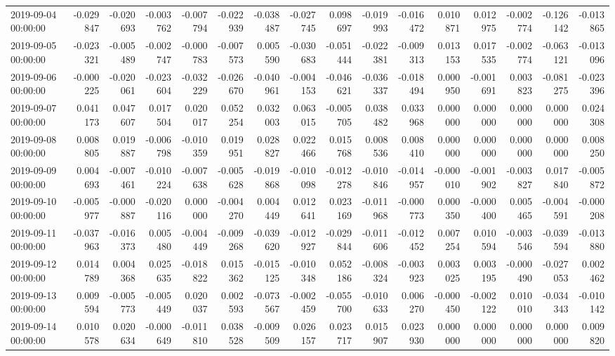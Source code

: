 \begin{tabular}{lrrrrrrrrrrrrrrr}
2019-09-04 00:00:00 & -0.029847 & -0.020693 & -0.003762 & -0.007794 & -0.022939 & -0.038487 & -0.027745 & 0.098697 & -0.019993 & -0.016472 & 0.010871 & 0.012975 & -0.002774 & -0.126142 & -0.013865 \\
2019-09-05 00:00:00 & -0.023321 & -0.005489 & -0.002747 & -0.000783 & -0.007573 & 0.005590 & -0.030683 & -0.051444 & -0.022381 & -0.009313 & 0.013153 & 0.017535 & -0.002774 & -0.063121 & -0.013096 \\
2019-09-06 00:00:00 & -0.000225 & -0.020061 & -0.023604 & -0.032229 & -0.026670 & -0.040961 & -0.004153 & -0.046621 & -0.036337 & -0.018494 & 0.000950 & -0.001691 & 0.003823 & -0.081275 & -0.023396 \\
2019-09-07 00:00:00 & 0.041173 & 0.047607 & 0.017504 & 0.020017 & 0.052254 & 0.032003 & 0.063015 & -0.005705 & 0.038482 & 0.033968 & 0.000000 & 0.000000 & 0.000000 & 0.000000 & 0.024308 \\
2019-09-08 00:00:00 & 0.008805 & 0.019887 & -0.006798 & -0.010359 & 0.019951 & 0.028827 & 0.022466 & 0.015768 & 0.008536 & 0.008410 & 0.000000 & 0.000000 & 0.000000 & 0.000000 & 0.008250 \\
2019-09-09 00:00:00 & 0.004693 & -0.007461 & -0.010224 & -0.007638 & -0.005628 & -0.019868 & -0.010098 & -0.012278 & -0.010846 & -0.014957 & -0.000010 & -0.001902 & -0.003827 & 0.017840 & -0.005872 \\
2019-09-10 00:00:00 & -0.005977 & -0.000887 & -0.020116 & 0.000000 & -0.004270 & 0.004449 & 0.012641 & 0.023169 & -0.011968 & -0.000773 & 0.000350 & -0.000400 & 0.005465 & -0.004591 & -0.000208 \\
2019-09-11 00:00:00 & -0.037963 & -0.016373 & 0.005480 & -0.004449 & -0.009268 & -0.039620 & -0.012927 & -0.029844 & -0.011606 & -0.012452 & 0.007254 & 0.010594 & -0.003546 & -0.039594 & -0.013880 \\
2019-09-12 00:00:00 & 0.014789 & 0.004368 & 0.025635 & -0.018822 & 0.015362 & -0.015125 & -0.010348 & 0.052186 & -0.008324 & -0.003923 & 0.003025 & 0.003195 & -0.000490 & -0.027053 & 0.002462 \\
2019-09-13 00:00:00 & 0.009594 & -0.005773 & -0.005449 & 0.020037 & 0.002593 & -0.073567 & -0.002459 & -0.055700 & -0.010633 & 0.006270 & -0.000450 & -0.002122 & 0.010010 & -0.034343 & -0.010142 \\
2019-09-14 00:00:00 & 0.010578 & 0.020634 & -0.000649 & -0.011810 & 0.038528 & -0.009509 & 0.026157 & 0.023717 & 0.015907 & 0.023930 & 0.000000 & 0.000000 & 0.000000 & 0.000000 & 0.009820 \\

\end{tabular}
